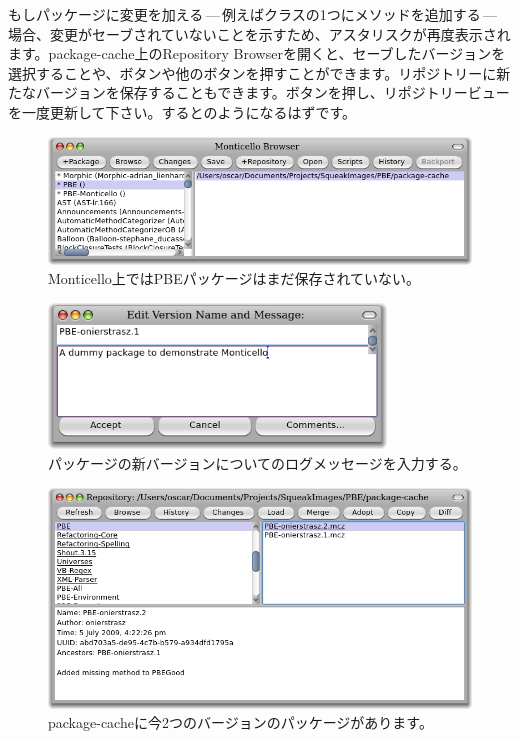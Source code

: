 \documentclass[a4paper,10pt,twoside]{book}
\begin{document}
もしパッケージに変更を加える\,---\,例えばクラスの1つにメソッドを追加する\,---\,場合、変更がセーブされていないことを示すため、アスタリスクが再度表示されます。package-cache上のRepository Browserを開くと、セーブしたバージョンを選択することや、ボタンや他のボタンを押すことができます。リポジトリーに新たなバージョンを保存することもできます。ボタンを押し、リポジトリービューを一度更新して下さい。するとのようになるはずです。

\begin{figure}[tbp]
	\begin{center}
		\includegraphics[width=\textwidth]{MC+PBE}
	\end{center}
	\caption{Monticello上ではPBEパッケージはまだ保存されていない。}
\end{figure}

\begin{figure}[tbp]
	\begin{center}
	\includegraphics[width=0.8\textwidth]{PBE-on}
	\end{center}
	\caption{パッケージの新バージョンについてのログメッセージを入力する。}
\end{figure}

\begin{figure}[tbp]
	\begin{center}
	\includegraphics[width=\textwidth]{package-cache-browser}
	\end{center}
	\caption{package-cacheに今2つのバージョンのパッケージがあります。}
\end{figure}
\end{document}
